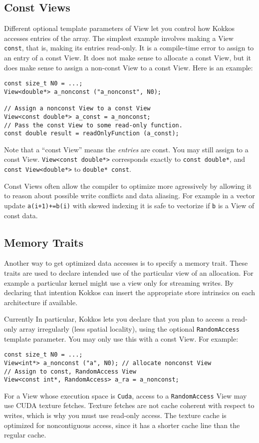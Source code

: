 \subsection{Const Views}

Different optional template parameters of View let you control how
Kokkos accesses entries of the array.  The simplest example involves
making a View \lstinline!const!, that is, making its entries read-only.  It
is a compile-time error to assign to an entry of a const View.  It
does not make sense to allocate a const View, but it does make sense
to assign a non-const View to a const View.  Here is an example:
\begin{lstlisting}
const size_t N0 = ...;
View<double*> a_nonconst ("a_nonconst", N0);

// Assign a nonconst View to a const View
View<const double*> a_const = a_nonconst;
// Pass the const View to some read-only function.
const double result = readOnlyFunction (a_const);
\end{lstlisting}
Note that a ``const View'' means the \emph{entries} are const.  You
may still assign to a const View.  \lstinline!View<const double*>!
corresponds exactly to \lstinline!const double*!, and
\lstinline!const View<double*>! to \lstinline!double* const!.

Const Views often allow the compiler to optimize more agressively by allowing it
to reason about possible write conflicts and data aliasing. For example in a vector
update \lstinline|a(i+1)+=b(i)| with skewed indexing it is safe to vectorize if
\lstinline|b| is a View of const data.
  
\subsection{Memory Traits}

Another way to get optimized data accesses is to specify a memory trait. 
These traits are used to declare intended use of the particular view of 
an allocation. For example a particular kernel might use a view only for 
streaming writes. By declaring that intention Kokkos can insert the 
appropriate store intrinsics on each architecture if available. 

Currently 
In particular, Kokkos lets you declare that you plan
to access a read-only array irregularly (less spatial locality), using
the optional \lstinline!RandomAccess! template parameter.  You may only use
this with a const View.  For example:
\begin{lstlisting}
const size_t N0 = ...;
View<int*> a_nonconst ("a", N0); // allocate nonconst View
// Assign to const, RandomAccess View
View<const int*, RandomAccess> a_ra = a_nonconst;
\end{lstlisting}
For a View whose execution space is \lstinline!Cuda!, access to a
\lstinline!RandomAccess! View may use CUDA texture fetches.  Texture
fetches are not cache coherent with respect to writes, which is why
you must use read-only access.  The texture cache is optimized for
noncontiguous access, since it has a shorter cache line than the
regular cache.

